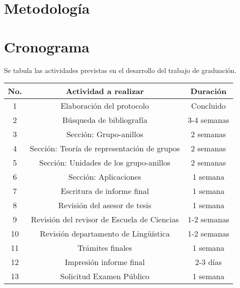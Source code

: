 \documentclass[12pt,letterpaper,titlepage]{article}
\begin{document}
\section{Metodología}


\newpage

\section{Cronograma}
Se tabula las actividades previstas en el desarrollo del trabajo de graduación.

\vspace{1cm}

\begin{tabular}{|c|c|c|}
  \hline
   \textbf{No.}  &  \textbf{Actividad a realizar} &  \textbf{Duración }\\ \hline
  1  & Elaboración del protocolo & Concluido \\
  2  & Búsqueda de bibliografía & 3-4 semanas \\
  3  & Sección: Grupo-anillos & 2 semanas \\
  4  & Sección: Teoría de representación de grupos & 2 semanas \\
  5  & Sección: Unidades de los grupo-anillos & 2 semanas \\
  6  & Sección: Aplicaciones & 1 semana \\
  7  & Escritura de informe final & 1 semana \\
  8  & Revisión del asesor de tesis & 1 semana \\
  9 & Revisión del revisor de Escuela de Ciencias & 1-2 semanas \\
  10 & Revisión departamento de Lingüística & 1-2 semanas \\
  11 & Trámites finales & 1 semana  \\
  12 & Impresión informe final & 2-3 días \\
  13 & Solicitud Examen Público & 1 semana \\
  \hline
\end{tabular}

\newpage
\end{document}
